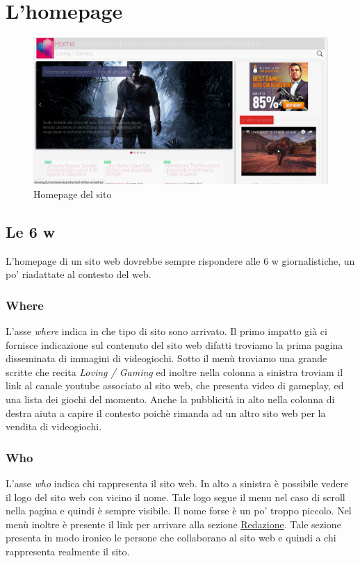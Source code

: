 \documentclass[../ProgettoTecWeb2.tex]{subfiles}
\begin{document}
\section{L'homepage}
	\begin{figure} [H]
		\centering
		\includegraphics[scale=0.3]{img/ScreenHomePage}
		\caption{Homepage del sito}
	\end{figure}
	\subsection{Le 6 w}
		L'homepage di un sito web dovrebbe sempre rispondere alle 6 w giornalistiche, un po' riadattate al contesto del web.
		\subsubsection{Where}
			L'asse \textit{where} indica in che tipo di sito sono arrivato. Il primo impatto già ci fornisce indicazione sul contenuto del sito web difatti troviamo la prima pagina disseminata di immagini di videogiochi. Sotto il menù troviamo una grande scritte che recita \textit{Loving / Gaming} ed inoltre nella colonna a sinistra troviam il link al canale youtube associato al sito web, che presenta video di gameplay, ed una lista dei giochi del momento. Anche la pubblicità in alto nella colonna di destra aiuta a capire il contesto poichè rimanda ad un altro sito web per la vendita di videogiochi.
		\subsubsection{Who}
			L'asse \textit{who} indica chi rappresenta il sito web. In alto a sinistra è possibile vedere il logo del sito web con vicino il nome. Tale logo segue il menu nel caso di scroll nella pagina e quindi è sempre visibile. Il nome forse è un po' troppo piccolo. Nel menù inoltre è presente il link per arrivare alla sezione \href{http://ilovevg.it/redazione/}{Redazione}. Tale sezione presenta in modo ironico le persone che collaborano al sito web e quindi a chi rappresenta realmente il sito.
\end{document}
